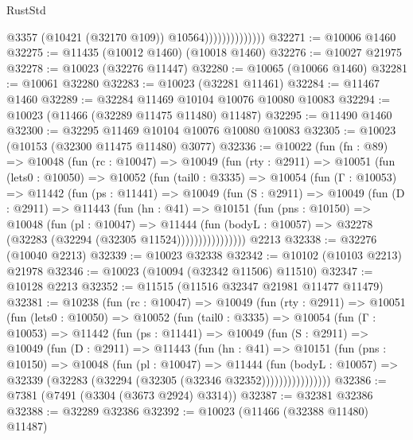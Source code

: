 \begin{lexlean}{RustStd}
\begin{coremodule}
                                @3357
                                (@10421 (@32170 @109))
                                @10564))))))))))))))
@32271 := @10006 @1460
@32275 := @11435 (@10012 @1460) (@10018 @1460)
@32276 := @10027 @21975
@32278 := @10023 (@32276 @11447)
@32280 := @10065 (@10066 @1460)
@32281 := @10061 @32280
@32283 := @10023 (@32281 @11461)
@32284 := @11467 @1460
@32289 := @32284 @11469 @10104 @10076 @10080 @10083
@32294 := @10023 (@11466 (@32289 @11475 @11480) @11487)
@32295 := @11490 @1460
@32300 := @32295 @11469 @10104 @10076 @10080 @10083
@32305 := @10023 (@10153 (@32300 @11475 @11480) @3077)
@32336 := @10022
    (fun (fn : @89) =>
    @10048
      (fun (rc : @10047) =>
      @10049
        (fun (rty : @2911) =>
        @10051
          (fun (lets0 : @10050) =>
          @10052
            (fun (tail0 : @3335) =>
            @10054
              (fun (Γ : @10053) =>
              @11442
                (fun (ps : @11441) =>
                @10049
                  (fun (S : @2911) =>
                  @10049
                    (fun (D : @2911) =>
                    @11443
                      (fun (hn : @41) =>
                      @10151
                        (fun (pns : @10150) =>
                        @10048
                          (fun (pl : @10047) =>
                          @11444
                            (fun (bodyL : @10057) =>
                            @32278 (@32283 (@32294 (@32305 @11524))))))))))))))))
    @2213
@32338 := @32276 (@10040 @2213)
@32339 := @10023 @32338
@32342 := @10102 (@10103 @2213) @21978
@32346 := @10023 (@10094 (@32342 @11506) @11510)
@32347 := @10128 @2213
@32352 := @11515 (@11516 @32347 @21981 @11477 @11479)
@32381 := @10238
    (fun (rc : @10047) =>
    @10049
      (fun (rty : @2911) =>
      @10051
        (fun (lets0 : @10050) =>
        @10052
          (fun (tail0 : @3335) =>
          @10054
            (fun (Γ : @10053) =>
            @11442
              (fun (ps : @11441) =>
              @10049
                (fun (S : @2911) =>
                @10049
                  (fun (D : @2911) =>
                  @11443
                    (fun (hn : @41) =>
                    @10151
                      (fun (pns : @10150) =>
                      @10048
                        (fun (pl : @10047) =>
                        @11444
                          (fun (bodyL : @10057) =>
                          @32339 (@32283 (@32294 (@32305 (@32346 @32352))))))))))))))))
@32386 := @7381 (@7491 (@3304 (@3673 @2924) @3314))
@32387 := @32381 @32386
@32388 := @32289 @32386
@32392 := @10023 (@11466 (@32388 @11480) @11487)

\end{coremodule}
\end{lexlean}
